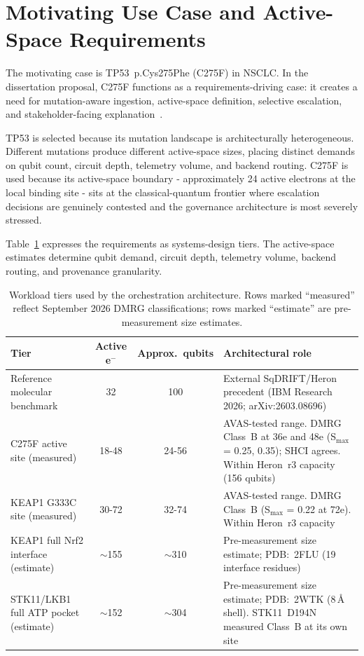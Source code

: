 \documentclass[11pt,letterpaper]{article}
\begin{document}
\section{Motivating Use Case and Active-Space Requirements}

The motivating case is TP53~p.Cys275Phe (C275F) in NSCLC.  In the dissertation proposal,
C275F functions as a requirements-driving case: it creates a need for mutation-aware ingestion,
active-space definition, selective escalation, and stakeholder-facing explanation~\cite{cohen2026proposal}.

TP53 is selected because its mutation landscape is architecturally heterogeneous.  Different
mutations produce different active-space sizes, placing distinct demands on qubit count,
circuit depth, telemetry volume, and backend routing.  C275F is used because its active-space
boundary - approximately 24 active electrons at the local binding site - sits at the
classical-quantum frontier where escalation decisions are genuinely contested and the
governance architecture is most severely stressed.

Table~\ref{tab:tiers} expresses the requirements as systems-design tiers.  The active-space
estimates determine qubit demand, circuit depth, telemetry volume, backend routing, and
provenance granularity.

\begin{table}[H]
\centering
\caption{Workload tiers used by the orchestration architecture.  Rows marked ``measured'' reflect September 2026 DMRG classifications; rows marked ``estimate'' are pre-measurement size estimates.}
\label{tab:tiers}
\small
\begin{tabular}{@{}lccp{6.5cm}@{}}
\toprule
\textbf{Tier} & \textbf{Active e$^{-}$} & \textbf{Approx.\ qubits} & \textbf{Architectural role} \\
\midrule
Reference molecular benchmark & 32 & 100 &
  External SqDRIFT/Heron precedent (IBM Research 2026; arXiv:2603.08696) \\
C275F active site (measured) & 18-48 & 24-56 &
  AVAS-tested range.  DMRG Class~B at 36e and 48e (S$_\mathrm{max}$ = 0.25, 0.35); SHCI agrees.  Within Heron~r3 capacity (156 qubits) \\
KEAP1 G333C site (measured) & 30-72 & 32-74 &
  AVAS-tested range.  DMRG Class~B (S$_\mathrm{max}$ = 0.22 at 72e).  Within Heron~r3 capacity \\
KEAP1 full Nrf2 interface (estimate) & $\sim$155 & $\sim$310 &
  Pre-measurement size estimate; PDB:~2FLU (19 interface residues) \\
STK11/LKB1 full ATP pocket (estimate) & $\sim$152 & $\sim$304 &
  Pre-measurement size estimate; PDB:~2WTK (8\,\AA{} shell).  STK11~D194N measured Class~B at its own site \\
\bottomrule
\end{tabular}
\end{table}
\end{document}
